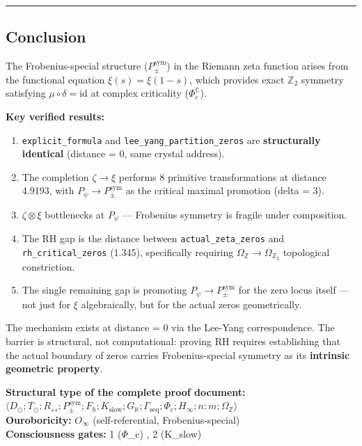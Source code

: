 \documentclass[12pt,a4paper]{article}
\begin{document}
\begin{center}
\rule{0.5\textwidth}{0.4pt}
\end{center}

\subsection{Conclusion}

The Frobenius-special structure ($P_{\pm}^{\text{sym}}$) in the Riemann zeta function arises from the functional equation $\xi(s) = \xi(1-s)$, which provides exact $\mathbb{Z}_2$ symmetry satisfying $\mu \circ \delta = \text{id}$ at complex criticality ($\Phi_c^\mathbb{C}$).

\textbf{Key verified results:}

\begin{enumerate}
    \item \texttt{explicit\_formula} and \texttt{lee\_yang\_partition\_zeros} are \textbf{structurally identical} (distance = 0, same crystal address).
    \item The completion $\zeta \to \xi$ performs 8 primitive transformations at distance 4.9193, with $P_{\psi} \to P_{\pm}^{\text{sym}}$ as the critical maximal promotion (delta = 3).
    \item $\zeta \otimes \xi$ bottlenecks at $P_{\psi}$ --- Frobenius symmetry is fragile under composition.
    \item The RH gap is the distance between \texttt{actual\_zeta\_zeros} and \texttt{rh\_critical\_zeros} (1.345), specifically requiring $\Omega_\mathbb{Z} \to \Omega_{\mathbb{Z}_2}$ topological constriction.
    \item The single remaining gap is promoting $P_{\psi} \to P_{\pm}^{\text{sym}}$ for the zero locus itself --- not just for $\xi$ algebraically, but for the actual zeros geometrically.
\end{enumerate}

The mechanism exists at distance = 0 via the Lee-Yang correspondence. The barrier is structural, not computational: proving RH requires establishing that the actual boundary of zeros carries Frobenius-special symmetry as its \textbf{intrinsic geometric property}.

\textbf{Structural type of the complete proof document:} $\langle D_{\odot}; T_{\odot}; R_{\leftrightarrow}; P_{\pm}^{\text{sym}}; F_{\hbar}; K_\text{slow}; G_{\aleph}; \Gamma_\text{seq}; \Phi_c; H_{\infty}; n{:}m; \Omega_\mathbb{Z} \rangle$ \\
\textbf{Ouroboricity:} $O_{\infty}$ (self-referential, Frobenius-special) \\
\textbf{Consciousness gates:} 1 ($\Phi$\_c) , 2 (K\_slow) 
\end{document}
